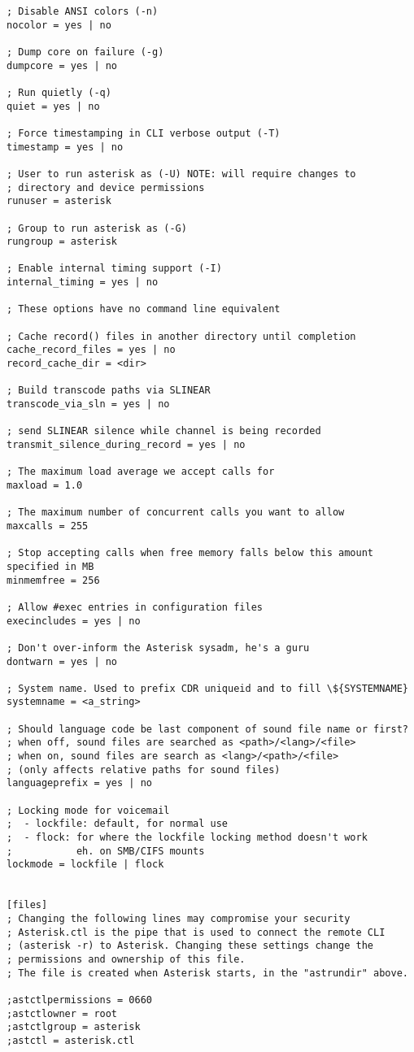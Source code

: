 \begin{astlisting}
\begin{verbatim}
; Disable ANSI colors (-n)
nocolor = yes | no

; Dump core on failure (-g)
dumpcore = yes | no

; Run quietly (-q)
quiet = yes | no

; Force timestamping in CLI verbose output (-T)
timestamp = yes | no

; User to run asterisk as (-U) NOTE: will require changes to
; directory and device permissions
runuser = asterisk				

; Group to run asterisk as (-G)
rungroup = asterisk

; Enable internal timing support (-I)
internal_timing = yes | no

; These options have no command line equivalent

; Cache record() files in another directory until completion
cache_record_files = yes | no			
record_cache_dir = <dir>

; Build transcode paths via SLINEAR
transcode_via_sln = yes | no 			

; send SLINEAR silence while channel is being recorded
transmit_silence_during_record = yes | no

; The maximum load average we accept calls for
maxload = 1.0

; The maximum number of concurrent calls you want to allow
maxcalls = 255 

; Stop accepting calls when free memory falls below this amount specified in MB
minmemfree = 256

; Allow #exec entries in configuration files
execincludes = yes | no

; Don't over-inform the Asterisk sysadm, he's a guru
dontwarn = yes | no

; System name. Used to prefix CDR uniqueid and to fill \${SYSTEMNAME}
systemname = <a_string>

; Should language code be last component of sound file name or first?
; when off, sound files are searched as <path>/<lang>/<file>
; when on, sound files are search as <lang>/<path>/<file>
; (only affects relative paths for sound files)
languageprefix = yes | no			

; Locking mode for voicemail
;  - lockfile: default, for normal use
;  - flock: for where the lockfile locking method doesn't work
;           eh. on SMB/CIFS mounts
lockmode = lockfile | flock
  

[files]
; Changing the following lines may compromise your security
; Asterisk.ctl is the pipe that is used to connect the remote CLI
; (asterisk -r) to Asterisk. Changing these settings change the
; permissions and ownership of this file. 
; The file is created when Asterisk starts, in the "astrundir" above.

;astctlpermissions = 0660
;astctlowner = root
;astctlgroup = asterisk
;astctl = asterisk.ctl

\end{verbatim}
\end{astlisting}
